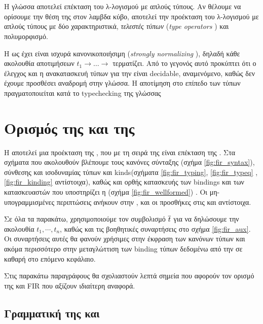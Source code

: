 \section{\FOM}
\label{sec:fom}

Η γλώσσα \FOM{} αποτελεί επέκταση του λ-λογισμού με απλούς τύπους. Αν θέλουμε να ορίσουμε
την θέση της στον λαμβδα κύβο, αποτελεί την προέκταση του λ-λογισμού με απλούς τύπους με
δύο χαρακτηριστικά, \emph{τελεστές τύπων} (\emph{type operators} ) και πολυμορφισμό.

Η \FOM{} ως έχει είναι ισχυρά κανονικοποιήσιμη (\emph{strongly normalizing} ), δηλαδή κάθε ακολουθία
αποτιμήσεων $t_1 \rightarrow \dots \rightarrow $ τερματίζει. Από το  γεγονός αυτό προκύπτει ότι ο έλεγχος
και η ανακατασκευή τύπων για την \FOM{} είναι decidable, αναμενόμενο, καθώς δεν έχουμε προσθέσει αναδρομή στην γλώσσα. Η αποτίμηση στο επίπεδο των τύπων πραγματοποιείται κατά το typechecking
της γλώσσας

\section{Ορισμός της \FOMF{} και της \FIR{}}
\label{sec:fomf}


Η \FIR{} αποτελεί μια προέκταση της \FOMF{}, που με τη σειρά της είναι επέκταση της \FOM{}.
Στα σχήματα που ακολουθούν βλέπουμε τους κανόνες σύνταξης (σχήμα \ref{fig:fir_syntax}), σύνθεσης και
ισοδυναμίας τύπων και kinds(σχήματα \ref{fig:fir_typing}, \ref{fig:fir_typeq} , \ref{fig:fir_kinding} αντίστοιχα),
καθώς και ορθής κατασκευής των bindings και των κατασκευαστών που υποστηρίζει η \FIR{} (σχήμα
\ref{fig:fir_wellformed}) . Οι μη-υπογραμμισμένες περιπτώσεις ανήκουν στην \FOM{}, και οι προσθήκες στις \fomfDiff{\FOMF{}} και \firDiff{\FIR{}} αντίστοιχα.

Σε όλα τα παρακάτω, χρησιμοποιούμε τον συμβολισμό $\overline{t}$ για να δηλώσουμε την ακολουθία
$t_1, \cdots, t_n$, καθώς και τις βοηθητικές συναρτήσεις στο σχήμα \ref{fig:fir_aux}. Οι συναρτήσεις
αυτές θα φανούν χρήσιμες στην έκφραση των κανόνων τύπων και ακόμα περισσότερο στην μεταγλώττιση
των binding τύπων δεδομένω από την \FIR{} σε καθαρή \FOMF{} στο επόμενο κεφάλαιο.

Στις παρακάτω παραγράφους θα σχολιαστούν λεπτά σημεία που αφορούν τον ορισμό της \FOMF{} και
FIR{} που αξίζουν ιδιαίτερη αναφορά.

\subsection{Γραμματική της \FOMF{} και \FIR{} }
\label{subsec:grammar}


